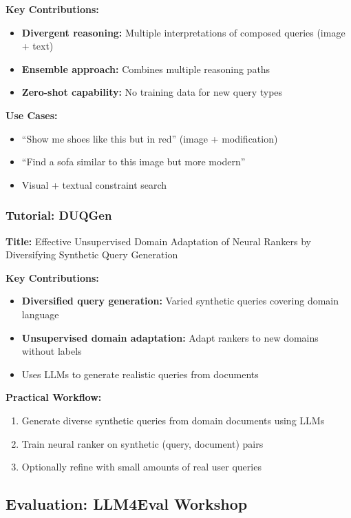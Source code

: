 \documentclass[11pt,letterpaper]{article}
\begin{document}
\textbf{Key Contributions:}
\begin{itemize}[leftmargin=*]
    \item \textbf{Divergent reasoning:} Multiple interpretations of composed queries (image + text)
    \item \textbf{Ensemble approach:} Combines multiple reasoning paths
    \item \textbf{Zero-shot capability:} No training data for new query types
\end{itemize}

\textbf{Use Cases:}
\begin{itemize}[leftmargin=*]
    \item ``Show me shoes like this but in red'' (image + modification)
    \item ``Find a sofa similar to this image but more modern''
    \item Visual + textual constraint search
\end{itemize}

\subsubsection{Tutorial: DUQGen}
\textbf{Title:} Effective Unsupervised Domain Adaptation of Neural Rankers by Diversifying Synthetic Query Generation

\textbf{Key Contributions:}
\begin{itemize}[leftmargin=*]
    \item \textbf{Diversified query generation:} Varied synthetic queries covering domain language
    \item \textbf{Unsupervised domain adaptation:} Adapt rankers to new domains without labels
    \item Uses LLMs to generate realistic queries from documents
\end{itemize}

\textbf{Practical Workflow:}
\begin{enumerate}[leftmargin=*]
    \item Generate diverse synthetic queries from domain documents using LLMs
    \item Train neural ranker on synthetic (query, document) pairs
    \item Optionally refine with small amounts of real user queries
\end{enumerate}

\subsection{Evaluation: LLM4Eval Workshop}
\end{document}
